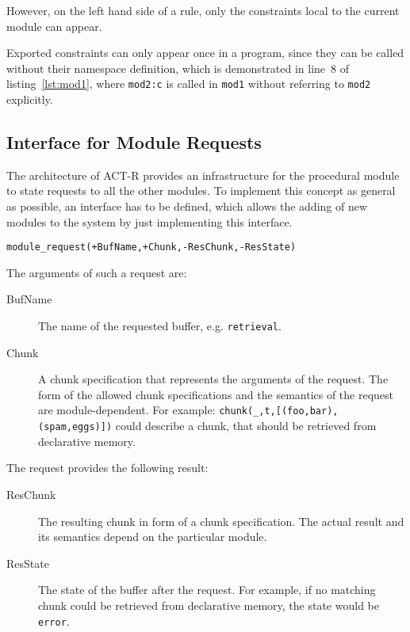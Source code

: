 \begin{example}
However, on the left hand side of a rule, only the constraints local to the current module can appear. 

Exported constraints can only appear once in a program, since they can be called without their namespace definition, which is demonstrated in line~8 of listing~\ref{lst:mod1}, where \lstinline|mod2:c| is called in \lstinline|mod1| without referring to \lstinline|mod2| explicitly.
\end{example}

\subsection{Interface for Module Requests}
\label{interface_for_module_requests}

The architecture of ACT-R provides an infrastructure for the procedural module to state requests to all the other modules. To implement this concept as general as possible, an interface has to be defined, which allows the adding of new modules to the system by just implementing this interface.

\begin{lstlisting}[caption={Simple Interface \emph{IModule}},label=lst:interface_module]
module_request(+BufName,+Chunk,-ResChunk,-ResState)
\end{lstlisting}

The arguments of such a request are:

\begin{description}
 \item[BufName] The name of the requested buffer, e.g. \lstinline|retrieval|.
 \item[Chunk] A chunk specification that represents the arguments of the request. The form of the allowed chunk specifications and the semantics of the request are module-dependent. For example: \lstinline|chunk(_,t,[(foo,bar),(spam,eggs)])| could describe a chunk, that should be retrieved from declarative memory.
\end{description}

The request provides the following result:

\begin{description}
 \item[ResChunk] The resulting chunk in form of a chunk specification. The actual result and its semantics depend on the particular module.
 \item[ResState] The state of the buffer after the request. For example, if no matching chunk could be retrieved from declarative memory, the state would be \lstinline|error|.
\end{description}

